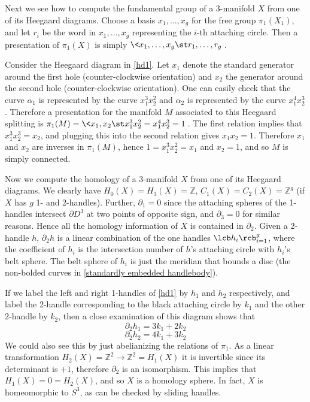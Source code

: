 Next we see how to compute the fundamental group of a 3-manifold $X$ from one of its Heegaard diagrams. Choose a basis $x_1,\ldots,x_g$ for the free group $\pi_1(X_1)$, and let $r_i$ be the word in $x_1,\ldots,x_g$ representing the $i$-th attaching circle. Then a presentation of $\pi_1(X)$ is simply $\< x_1,\ldots,x_g \st r_1,\ldots,r_g \>$. 

\begin{example}
Consider the Heegaard diagram in \cref{hd1}. Let $x_1$ denote the standard generator around the first hole (counter-clockwise orientation) and $x_2$ the generator around the second hole (counter-clockwise orientation). One can easily check that the curve $\alpha_1$ is represented by the curve $x_1^3 x_2^2$ and $\alpha_2$ is represented by the curve $x_1^4 x_2^3$. Therefore a presentation for the manifold $M$ associated to this Heegaard splitting is $\pi_1(M) = \< x_1,x_2 \st x_1^3 x_2^2 = x_1^4 x_2^3 = 1 \>$. The first relation implies that $x_1^3 x_2^3 = x_2$, and plugging this into the second relation gives $x_1 x_2 = 1$. Therefore $x_1$ and $x_2$ are inverses in $\pi_1(M)$, hence $1=x_1^3 x_2^2 = x_1$ and $x_2=1$, and so $M$ is simply connected. 
\end{example}

Now we compute the homology of a 3-manifold $X$ from one of its Heegaard diagrams. We clearly have $H_0(X) = H_3(X) = \mathbb Z$, $C_1(X) = C_2(X) = \mathbb Z^g$ (if $X$ has $g$ 1- and 2-handles). Further, $\partial_1=0$ since the attaching spheres of the 1-handles intersect $\partial D^3$ at two points of opposite sign, and $\partial_3=0$ for similar reasons. Hence all the homology information of $X$ is contained in $\partial_2$. Given a 2-handle $h$, $\partial_2 h$ is a linear combination of the one handles $\lcb h_i \rcb_{i=1}^g$, where the coefficient of $h_i$ is the intersection number of $h$'s attaching circle with $h_i$'s belt sphere. The belt sphere of $h_i$ is just the meridian that bounds a disc (the non-bolded curves in \cref{standardly embedded handlebody}). 

\begin{example}
If we label the left and right 1-handles of \cref{hd1} by $h_1$ and $h_2$ respectively, and label the 2-handle corresponding to the black attaching circle by $k_1$ and the other 2-handle by $k_2$, then a close examination of this diagram shows that
\[ \partial_2 h_1 = 3k_1+2k_2 \]
\[ \partial_2 h_2 = 4k_1+3k_2 \]
We could also see this by just abelianizing the relations of $\pi_1$. As a linear transformation $H_2(X) = \mathbb Z^2 \rightarrow \mathbb Z^2 = H_1(X)$ it is invertible since its determinant is $+1$, therefore $\partial_2$ is an isomorphism. This implies that $H_1(X)=0=H_2(X)$, and so $X$ is a homology sphere. In fact, $X$ is homeomorphic to $S^3$, as can be checked by sliding handles.
\end{example}


